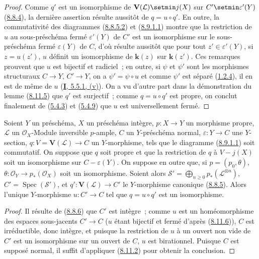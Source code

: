 \begin{proof}
Comme $q'$ est un isomorphisme de $\mathbf{V}(\mathcal{L})\setmin j(X)$ sur
$C'\setmin\varepsilon'(Y)$ (\hyperref[II.8.8.4-fr]{8.8.4}), la dernière assertion
résulte aussitôt de $q=u\circ q'$. En outre, la commutativité des diagrammes
(\hyperref[II.8.8.5.2-fr]{8.8.5.2}) et
(\hyperref[II.8.9.1.1-fr]{8.9.1.1}) montre que la restriction de $u$ au
sous-préschéma fermé $\varepsilon'(Y)$ de $C'$ est un isomorphisme sur le
sous-préschéma fermé $\varepsilon(Y)$ de $C$, d'où résulte aussitôt que pour
tout $z'\in\varepsilon'(Y)$, si $z=u(z')$, $u$ définit un isomorphisme de
$\boldsymbol{k}(z)$ sur $\boldsymbol{k}(z')$. Ces remarques prouvent que $u$ est bijectif et radiciel~;
en outre, si $\psi$ et $\psi'$ sont les morphismes structuraux $C\to Y$,
$C'\to Y$, on a $\psi'=\psi\circ u$ et comme $\psi'$ est séparé
(\hyperref[II.1.2.4-fr]{1.2.4}), il en est de même de $u$
(\hyperref[I.5.5.1-fr]{\textbf{I}, 5.5.1, (v)}). On a vu d'autre part dans la
démonstration du lemme (\hyperref[II.8.11.5-fr]{8.11.5}) que $q'$ est
surjectif~; comme $q=u\circ q'$ est propre, on conclut finalement de
(\hyperref[II.5.4.3-fr]{5.4.3}) et (\hyperref[II.5.4.9-fr]{5.4.9}) que $u$
est universellement fermé.
\end{proof}

\begin{proposition}[8.11.7]
\label{II.8.11.7-fr}
Soient $Y$ un préschéma, $X$ un préschéma \textup{intègre}, $p:X\to Y$ un morphisme
propre, $\mathcal{L}$ un $\mathcal{O}_X$-Module inversible $p$-ample, $C$ un
$Y$-préschéma \textup{normal}, $\varepsilon:Y\to C$ une $Y$-section,
$q:V=\mathbf{V}(\mathcal{L})\to C$ un $Y$-morphisme, tels que le diagramme
\textup{(\hyperref[II.8.9.1.1-fr]{8.9.1.1})} soit commutatif. On suppose que $q$ soit
propre et que la restriction de $q$ à $V-j(X)$ soit un isomorphisme sur
$C-\varepsilon(Y)$. On suppose en outre que,
si $p=(p_0,\theta)$, $\theta:\mathcal{O}_Y\to p_*(\mathcal{O}_X)$ soit un
isomorphisme. Soient alors
$\mathcal{S}'=\bigoplus_{n\geqslant0}p_*(\mathcal{L}^{\otimes n})$,
$C'=\operatorname{Spec}(\mathcal{S}')$, \textup{et}
$q':\mathbf{V}(\mathcal{L})\to C'$ le $Y$-morphisme canonique
\textup{(\hyperref[II.8.8.5-fr]{8.8.5})}. Alors l'unique $Y$-morphisme $u:C'\to C$ tel
que $q=u\circ q'$ est un \textup{isomorphisme}.
\end{proposition}

\begin{proof}
Il résulte de (\hyperref[II.8.8.6-fr]{8.8.6}) que $C'$ est intègre~; comme
$u$ est un homéomorphisme des espaces sous-jacents $C'\to C$ ($u$ étant
bijectif et fermé d'après (\hyperref[II.8.11.6-fr]{8.11.6})), $C$ est
irréductible, donc intègre, et puisque la restriction de $u$ à un ouvert non
vide de $C'$ est un isomorphisme sur un ouvert de $C$, $u$ est birationnel.
Puisque $C$ est supposé normal, il suffit d'appliquer
(\hyperref[II.8.11.2-fr]{8.11.2}) pour obtenir la conclusion.
\end{proof}

